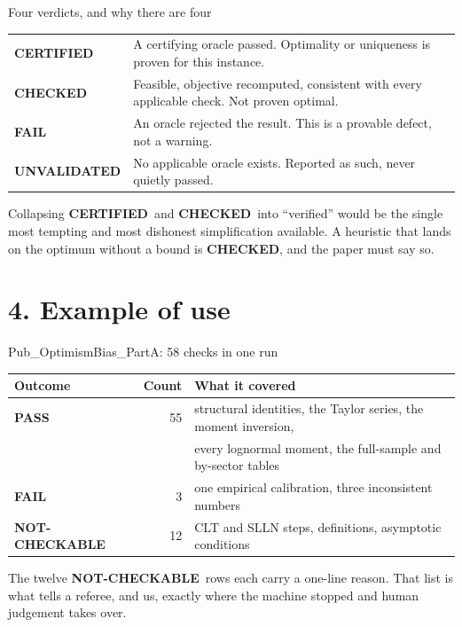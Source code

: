 \documentclass[aspectratio=169,11pt]{beamer}
\newcommand{\code}[1]{{\ttfamily\small #1}}
\newcommand{\PASS}{{\color{okgreen}\bfseries PASS}}
\newcommand{\FAIL}{{\color{badred}\bfseries FAIL}}
\newcommand{\CERT}{{\color{okgreen}\bfseries CERTIFIED}}
\newcommand{\CHK}{{\color{ink}\bfseries CHECKED}}
\newcommand{\UNV}{{\color{flagamber}\bfseries UNVALIDATED}}
\newcommand{\NC}{{\color{slate}\bfseries NOT-CHECKABLE}}
\begin{document}
\begin{frame}{Four verdicts, and why there are four}
  \begin{center}
  \begin{tabular}{@{}lp{}@{}}
    \toprule
    \CERT & A certifying oracle passed. Optimality or uniqueness is \alert{proven} for this
            instance. \\[0.5em]
    \CHK  & Feasible, objective recomputed, consistent with every applicable check. \alert{Not}
            proven optimal. \\[0.5em]
    \FAIL & An oracle rejected the result. This is a provable defect, not a warning. \\[0.5em]
    \UNV  & No applicable oracle exists. Reported as such, never quietly passed. \\
    \bottomrule
  \end{tabular}
  \end{center}
  \vfill
  Collapsing \CERT\ and \CHK\ into ``verified'' would be the single most tempting and most
  dishonest simplification available. A heuristic that lands on the optimum without a bound is
  \CHK, and the paper must say so.
\end{frame}

\section{4. Example of use}
\begin{frame}[plain]
  \vfill{}\vfill
\end{frame}

\begin{frame}{\code{Pub\_OptimismBias\_PartA}: 58 checks in one run}
  \begin{center}
  {\small
  \begin{tabular}{@{}lrl@{}}
    \toprule
    \textbf{Outcome} & \textbf{Count} & \textbf{What it covered} \\
    \midrule
    \PASS & 55 & structural identities, the Taylor series, the moment inversion, \\
          &    & every lognormal moment, the full-sample and by-sector tables \\
    \FAIL &  3 & one empirical calibration, three inconsistent numbers \\
    \NC   & 12 & CLT and SLLN steps, definitions, asymptotic conditions \\
    \bottomrule
  \end{tabular}}
  \end{center}
  \vfill
  The twelve \NC\ rows each carry a one-line reason. That list is what tells a referee, and us,
  exactly where the machine stopped and human judgement takes over.
\end{frame}
\end{document}
